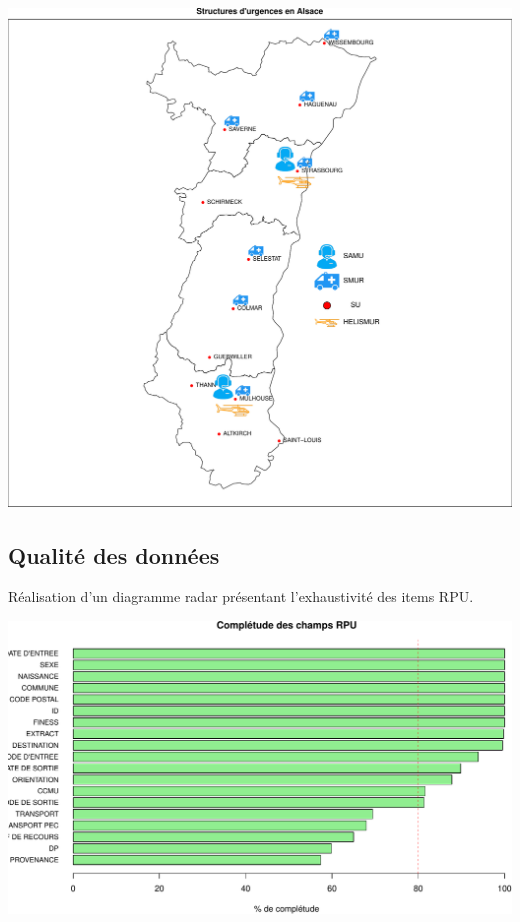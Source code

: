 \documentclass[]{article}
\begin{document}
\begin{center}\includegraphics{Figs/samu_smur_su-1} \end{center}

\subsection{Qualité des données}\label{qualite-des-donnees}

Réalisation d'un diagramme radar présentant l'exhaustivité des items
RPU.

\includegraphics{Figs/completude-1.pdf}
\end{document}
